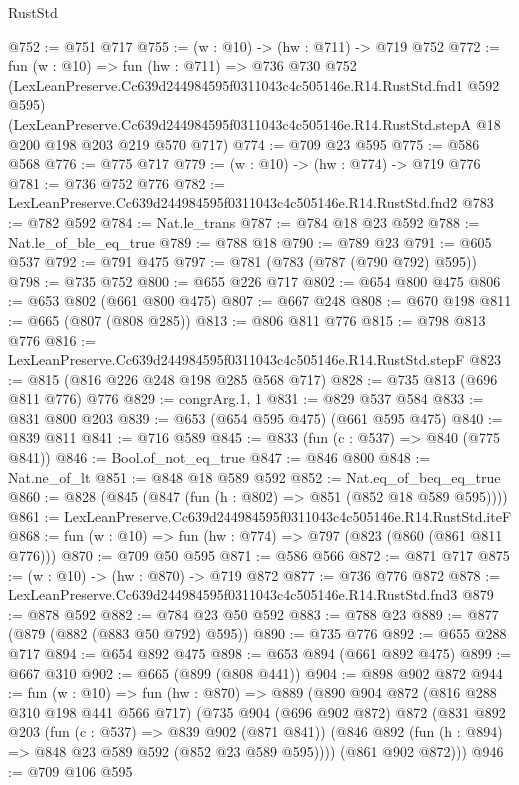 \begin{lexlean}{RustStd}
\begin{coremodule}
@752 := @751 @717
@755 := (w : @10) -> (hw : @711) -> @719 @752
@772 := fun (w : @10) =>
  fun (hw : @711) =>
  @736
    @730
    @752
    (LexLeanPreserve.Cc639d244984595f0311043c4c505146e.R14.RustStd.fnd1 @592 @595)
    (LexLeanPreserve.Cc639d244984595f0311043c4c505146e.R14.RustStd.stepA
      @18
      @200
      @198
      @203
      @219
      @570
      @717)
@774 := @709 @23 @595
@775 := @586 @568
@776 := @775 @717
@779 := (w : @10) -> (hw : @774) -> @719 @776
@781 := @736 @752 @776
@782 := LexLeanPreserve.Cc639d244984595f0311043c4c505146e.R14.RustStd.fnd2
@783 := @782 @592
@784 := Nat.le_trans
@787 := @784 @18 @23 @592
@788 := Nat.le_of_ble_eq_true
@789 := @788 @18
@790 := @789 @23
@791 := @605 @537
@792 := @791 @475
@797 := @781 (@783 (@787 (@790 @792) @595))
@798 := @735 @752
@800 := @655 @226 @717
@802 := @654 @800 @475
@806 := @653 @802 (@661 @800 @475)
@807 := @667 @248
@808 := @670 @198
@811 := @665 (@807 (@808 @285))
@813 := @806 @811 @776
@815 := @798 @813 @776
@816 := LexLeanPreserve.Cc639d244984595f0311043c4c505146e.R14.RustStd.stepF
@823 := @815 (@816 @226 @248 @198 @285 @568 @717)
@828 := @735 @813 (@696 @811 @776) @776
@829 := congrArg.{1, 1}
@831 := @829 @537 @584
@833 := @831 @800 @203
@839 := @653 (@654 @595 @475) (@661 @595 @475)
@840 := @839 @811
@841 := @716 @589
@845 := @833 (fun (c : @537) => @840 (@775 @841))
@846 := Bool.of_not_eq_true
@847 := @846 @800
@848 := Nat.ne_of_lt
@851 := @848 @18 @589 @592
@852 := Nat.eq_of_beq_eq_true
@860 := @828 (@845 (@847 (fun (h : @802) => @851 (@852 @18 @589 @595))))
@861 := LexLeanPreserve.Cc639d244984595f0311043c4c505146e.R14.RustStd.iteF
@868 := fun (w : @10) => fun (hw : @774) => @797 (@823 (@860 (@861 @811 @776)))
@870 := @709 @50 @595
@871 := @586 @566
@872 := @871 @717
@875 := (w : @10) -> (hw : @870) -> @719 @872
@877 := @736 @776 @872
@878 := LexLeanPreserve.Cc639d244984595f0311043c4c505146e.R14.RustStd.fnd3
@879 := @878 @592
@882 := @784 @23 @50 @592
@883 := @788 @23
@889 := @877 (@879 (@882 (@883 @50 @792) @595))
@890 := @735 @776
@892 := @655 @288 @717
@894 := @654 @892 @475
@898 := @653 @894 (@661 @892 @475)
@899 := @667 @310
@902 := @665 (@899 (@808 @441))
@904 := @898 @902 @872
@944 := fun (w : @10) =>
  fun (hw : @870) =>
  @889
    (@890
      @904
      @872
      (@816 @288 @310 @198 @441 @566 @717)
      (@735
        @904
        (@696 @902 @872)
        @872
        (@831
          @892
          @203
          (fun (c : @537) => @839 @902 (@871 @841))
          (@846 @892 (fun (h : @894) => @848 @23 @589 @592 (@852 @23 @589 @595))))
        (@861 @902 @872)))
@946 := @709 @106 @595

\end{coremodule}
\end{lexlean}
